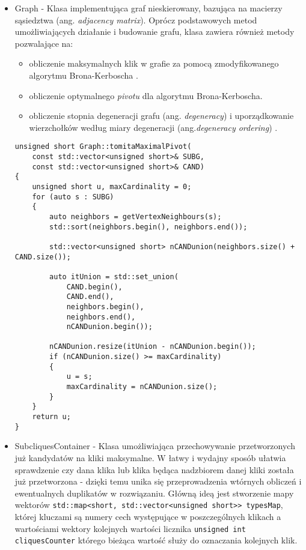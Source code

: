 \documentclass[12pt]{article}
\def\inline{\lstinline[basicstyle=\ttfamily,keywordstyle={}]}
\begin{document}
\begin{itemize}
\item Graph - Klasa implementująca graf nieskierowany, bazująca na macierzy sąsiedztwa (ang. \textit{adjacency matrix}). Oprócz podstawowych metod umożliwiających działanie i budowanie grafu, klasa zawiera również metody pozwalające na:

\begin{itemize}
\item obliczenie maksymalnych klik w grafie za pomocą zmodyfikowanego algorytmu Brona-Kerboscha \cite{chinczyki}.
\item obliczenie optymalnego \textit{pivotu} \cite{pivot} dla algorytmu Brona-Kerboscha.
\item obliczenie stopnia degeneracji grafu (ang. \textit{degeneracy}) i uporządkowanie wierzchołków według miary degeneracji (ang.\textit{degeneracy ordering}) \cite{degenerat}.
\end{itemize}

\begin{minipage}{\linewidth}
\begin{lstlisting}[caption={Kod metody tomitaMaximalPivot umożliwiającej wyliczenie optymalnego punktu \textit{pivot}}]
unsigned short Graph::tomitaMaximalPivot(
	const std::vector<unsigned short>& SUBG,
    const std::vector<unsigned short>& CAND)
{
	unsigned short u, maxCardinality = 0;
	for (auto s : SUBG)
	{
		auto neighbors = getVertexNeighbours(s);
		std::sort(neighbors.begin(), neighbors.end());
		
		std::vector<unsigned short> nCANDunion(neighbors.size() + CAND.size());
        
		auto itUnion = std::set_union(
        	CAND.begin(),
            CAND.end(),
            neighbors.begin(),
            neighbors.end(),
            nCANDunion.begin());
            
		nCANDunion.resize(itUnion - nCANDunion.begin());
		if (nCANDunion.size() >= maxCardinality)
		{
			u = s;
			maxCardinality = nCANDunion.size();
		}
	}
	return u;
}
\end{lstlisting}
\end{minipage}

\item SubcliquesContainer - Klasa umożliwiająca przechowywanie przetworzonych już kandydatów na kliki maksymalne. W łatwy i wydajny sposób ułatwia sprawdzenie czy dana klika lub klika będąca nadzbiorem danej kliki została już przetworzona - dzięki temu unika się przeprowadzenia wtórnych obliczeń i ewentualnych duplikatów w rozwiązaniu. Główną ideą jest stworzenie mapy wektorów \inline{std::map<short, std::vector<unsigned short>> typesMap}, której kluczami są numery cech występujące w poszczególnych klikach a wartościami wektory kolejnych wartości licznika \inline{unsigned int cliquesCounter} którego bieżąca wartość służy do oznaczania kolejnych klik.


\end{itemize}
\end{document}
